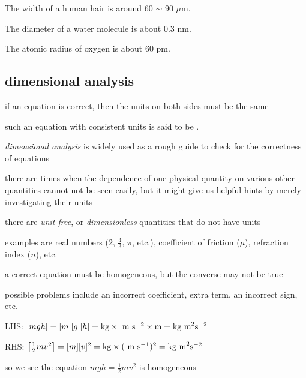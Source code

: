 	The width of a human hair is around 60 $\sim$ 90 $\mu$m.
	
	The diameter of a water molecule is about 0.3 nm.
	
	The atomic radius of oxygen is about 60 pm. 

\subsection{dimensional analysis}

\begin{ilight}
	if an equation is correct, then the units on both sides must be the same
	
	such an equation with consistent units is said to be .
\end{ilight}

\emph{dimensional analysis} is widely used as a rough guide to check for the correctness of equations

there are times when the dependence of one physical quantity on various other quantities cannot not be seen easily, but it might give us helpful hints by merely investigating their units

\cmt there are \emph{unit free}, or \emph{dimensionless} quantities that do not have units

examples are real numbers (2, $\frac{4}{3}$, $\pi$, etc.), coefficient of friction ($\mu$), refraction index ($n$), etc.

\cmt a correct equation must be homogeneous, but the converse may not be true

possible problems include an incorrect coefficient, extra term, an incorrect sign, etc.

\begin{soln}
 LHS: $[mgh]=[m][g][h] = \text{kg} \times \text{ m s$^{-2}$} \times \text{m} = \text{kg m}^2\text{s}^{-2}$
	
	RHS: $\left[\frac{1}{2}mv^2\right] = [m][v]^2 = \text{kg} \times (\text{ m s$^{-1}$})^2 = \text{kg m}^2\text{s}^{-2}$
	
	so we see the equation $mgh = \frac{1}{2}mv^2$ is homogeneous \end{soln}
	

